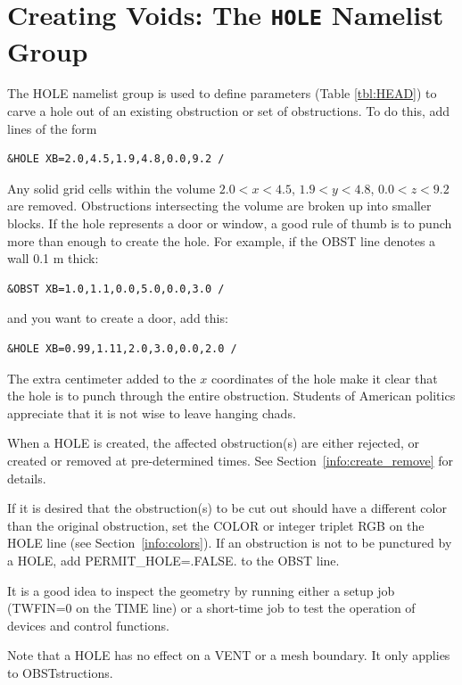 \documentclass[11pt]{book}
\begin{document}
\section{Creating Voids: The \texorpdfstring{{\tt HOLE}}{HOLE} Namelist Group}%
\label{info:HOLE}

The {\ct HOLE} namelist group is used to define parameters (Table \ref{tbl:HEAD}) to carve a hole
out of an existing obstruction or set of obstructions. To do this, add lines of the form

\footnotesize
\begin{verbatim}
&HOLE XB=2.0,4.5,1.9,4.8,0.0,9.2 /
\end{verbatim}
\normalsize
Any solid grid cells within the volume $2.0<x<4.5$, $1.9<y<4.8$,
$0.0<z<9.2$ are removed. Obstructions intersecting the volume are
broken up into smaller blocks. If the hole represents a door or window, a
good rule of thumb is to punch more than enough to create the hole. For
example, if the {\ct OBST} line denotes a wall 0.1 m thick:

\footnotesize
\begin{verbatim}
&OBST XB=1.0,1.1,0.0,5.0,0.0,3.0 /
\end{verbatim}
\normalsize
and you want to create a door, add this:

\footnotesize
\begin{verbatim}
&HOLE XB=0.99,1.11,2.0,3.0,0.0,2.0 /
\end{verbatim}
\normalsize
The extra centimeter added to the $x$ coordinates of the hole make it clear
that the hole is to punch through the entire obstruction. Students of
American politics appreciate that it is not wise to leave hanging
chads.

When a {\ct HOLE} is created, the affected obstruction(s) are either rejected, or
created or removed at pre-determined times. See
Section~\ref{info:create_remove} for details.

If it is desired that the obstruction(s) to be cut out should have a different color
than the original obstruction, set the {\ct COLOR} or integer triplet {\ct RGB} on the {\ct HOLE} line (see Section~\ref{info:colors}).
If an obstruction is not to be punctured by a {\ct HOLE}, add
{\ct PERMIT\_HOLE=.FALSE.} to the {\ct OBST} line.

It is a good idea to inspect the geometry by running either a setup job
({\ct TWFIN=0} on the {\ct TIME} line) or a short-time job to test the operation of devices and control functions.

\begin{warning}
\noindent
Note that a {\ct HOLE} has no effect on a {\ct VENT} or a mesh boundary. It only applies to {\ct OBST}structions.
\end{warning}
\end{document}
